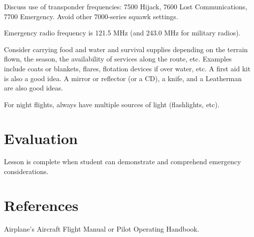 Discuss use of transponder frequencies: 7500 Hijack, 7600 Lost Communications,
7700 Emergency. Avoid other 7000-series squawk settings.

Emergency radio frequency is 121.5 MHz (and 243.0 MHz for military radios).

Consider carrying food and water and survival supplies depending on the terrain
flown, the season, the availability of services along the route, etc. Examples
include coats or blankets, flares, flotation devices if over water, etc. A
first aid kit is also a good idea. A mirror or reflector (or a CD), a knife,
and a Leatherman are also good ideas.

For night flights, always have multiple sources of light (flashlights, etc).

\section{Evaluation}


Lesson is complete when student can demonstrate and comprehend emergency
considerations.

\section{References}

Airplane’s Aircraft Flight Manual or Pilot Operating Handbook.
